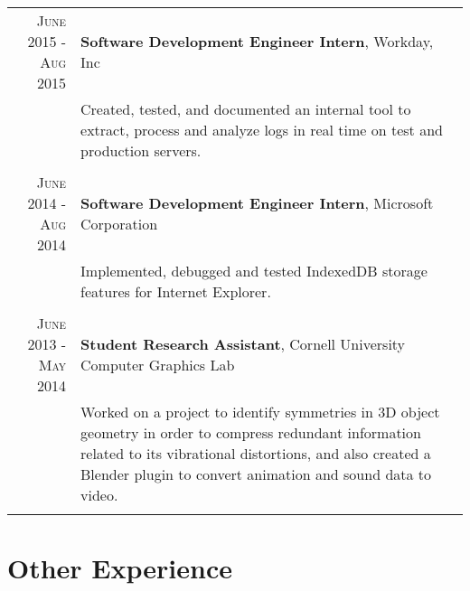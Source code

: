 \documentclass[a4paper,10pt]{article} %
\begin{document}
\begin{tabular}{r|p{11cm}}
\textsc{June 2015 - Aug 2015} & \textbf{Software Development Engineer Intern}, Workday, Inc\\
& \footnotesize{Created, tested, and documented an internal tool to extract, process and analyze logs in real time on test and production servers.}\\
\multicolumn{2}{c}{} \\


\textsc{June 2014 - Aug 2014} & \textbf{Software Development Engineer Intern}, Microsoft Corporation\\
& \footnotesize{Implemented, debugged and tested IndexedDB storage features for Internet Explorer.}\\
\multicolumn{2}{c}{} \\


\textsc{June 2013 - May 2014} & \textbf{Student Research Assistant}, Cornell University Computer Graphics Lab\\
& \footnotesize{Worked on a project to identify symmetries in 3D object geometry in order to compress redundant information related to its vibrational distortions, and also created a Blender plugin to convert animation and sound data to video.}\\
\multicolumn{2}{c}{} \\

\end{tabular}


\section{Other Experience}
\end{document}
